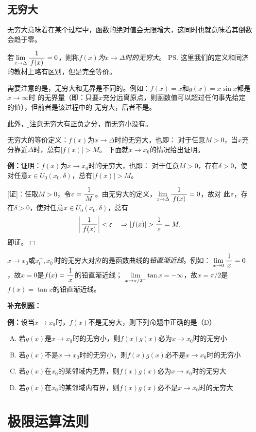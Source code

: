 \subsection{无穷大}

无穷大意味着在某个过程中，函数的绝对值会无限增大，这同时也就意味着其倒数会趋于零。

若$\lim\limits_{x\to{\Delta}}\displaystyle\frac{\,{1}\,}{\,{f(x)}\,}=0$，则称{\it $f(x)$为$x\to\Delta$时的无穷大}。
\ps{这里我们的定义和同济的教材上略有区别，但是完全等价}。

需要注意的是，无穷大和无界是不同的。例如：$f(x)=x$和$g(x)=x\sin x$都是$x\to\infty$时
的无界量（即：只要$x$充分远离原点，则函数值可以超过任何事先给定的值），但前者是该过程中的
无穷大，后者不是。

此外，{\b 要注意无穷大有正负之分，而无穷小没有。}

无穷大的等价定义：$f(x)$为$x\to\Delta$时的无穷大，也即：
对于任意$M>0$，当$x$充分靠近$\Delta$时，总有$|f(x)|>M$。
下面就$x\to x_0$的情况给出证明。

{\bf 例：}证明：$f(x)$为$x\to x_0$时的无穷大，也即：
对于任意$M>0$，存在$\delta>0$，使对任意$x\in U_0(x_0,\delta)$，总有$|f(x)|>M$。

[证]：任取$M>0$，令$\varepsilon=\displaystyle\frac{\,{1}\,}{\,{M}\,}$。由无穷大的定义，$\lim\limits_{x\to{\Delta}}\displaystyle\frac{\,{1}\,}{\,{f(x)}\,}=0$，故对
此$\varepsilon$，存在$\delta>0$，使对任意$x\in U_0(x_0,\delta)$，总有
$$\left|\df1{f(x)}\right|<\e\quad\Rightarrow |f(x)|>\df1{\e}=M.$$
即证。\hfill $\Box$

{\b$x\to x_0$或$x_0^+,x_0^-$时的无穷大对应的是函数曲线的{\it 铅直渐近线}}。例如：
$\lim\limits_{x\to{0}}\displaystyle\frac{\,{1}\,}{\,{x}\,}=0$，故$x=0$是$f(x)=\displaystyle\frac{\,{1}\,}{\,{x}\,}$的铅直渐近线；
$\lim\limits_{x\to{\pi/2^+}}\tan x=-\infty$，故$x=\pi/2$是$f(x)=\tan x$的铅直渐近线。

{\bf 补充例题：}

{\bf 例：}设当$x\to
x_0$时，$f(x)$不是无穷大，则下列命题中正确的是（D）
\begin{enumerate}[(A)]
  \setlength{\itemindent}{1cm}
  \item 若$g(x)$是$x\to x_0$时的无穷小，则$f(x)g(x)$必为$x\to x_0$时的无穷小
  \item 若$g(x)$不是$x\to x_0$时的无穷小，则$f(x)g(x)$必不是$x\to x_0$时的无穷小
  \item 若$g(x)$在$x_0$的某邻域内无界，则$f(x)g(x)$必为$x\to x_0$时的无穷大
  \item 若$g(x)$在$x_0$的某邻域内有界，则$f(x)g(x)$必不是$x\to x_0$时的无穷大
\end{enumerate}

\section{极限运算法则}


